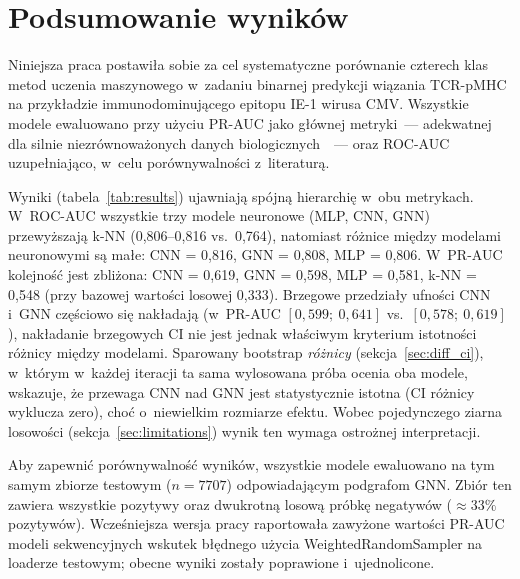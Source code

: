 \documentclass{SGGW-thesis}
\begin{document}
\section{Podsumowanie wyników}

Niniejsza praca postawiła sobie za cel systematyczne porównanie czterech klas metod uczenia
maszynowego w~zadaniu binarnej predykcji wiązania TCR-pMHC na przykładzie immunodominującego
epitopu IE-1 wirusa CMV. Wszystkie modele ewaluowano przy użyciu PR-AUC jako głównej metryki~---
adekwatnej dla silnie niezrównoważonych danych biologicznych~\cite{davis2006}~---
oraz ROC-AUC uzupełniająco, w~celu porównywalności z~literaturą.

Wyniki (tabela~\ref{tab:results}) ujawniają spójną hierarchię w~obu metrykach. W~ROC-AUC
wszystkie trzy modele neuronowe (MLP, CNN, GNN) przewyższają k-NN (0,806--0,816 vs.\ 0,764),
natomiast różnice między modelami neuronowymi są małe: CNN = 0,816, GNN = 0,808, MLP = 0,806.
W~PR-AUC kolejność jest zbliżona: CNN = 0,619, GNN = 0,598, MLP = 0,581, k-NN = 0,548
(przy bazowej wartości losowej 0,333). Brzegowe przedziały ufności CNN i~GNN częściowo się
nakładają (w~PR-AUC $[0{,}599;\ 0{,}641]$ vs.\ $[0{,}578;\ 0{,}619]$), nakładanie brzegowych CI
nie jest jednak właściwym kryterium istotności różnicy między modelami. Sparowany bootstrap
\textit{różnicy} (sekcja~\ref{sec:diff_ci}), w~którym w~każdej iteracji ta sama wylosowana próba
ocenia oba modele, wskazuje, że przewaga CNN nad GNN jest statystycznie istotna (CI różnicy
wyklucza zero), choć o~niewielkim rozmiarze efektu. Wobec pojedynczego ziarna losowości
(sekcja~\ref{sec:limitations}) wynik ten wymaga ostrożnej interpretacji.

Aby zapewnić porównywalność wyników, wszystkie modele ewaluowano na tym samym zbiorze testowym
($n{=}7707$) odpowiadającym podgrafom GNN. Zbiór ten zawiera wszystkie pozytywy oraz
dwukrotną losową próbkę negatywów (${\approx}33\%$ pozytywów). Wcześniejsza wersja pracy
raportowała zawyżone wartości PR-AUC modeli sekwencyjnych wskutek błędnego użycia
WeightedRandomSampler na loaderze testowym; obecne wyniki zostały poprawione i~ujednolicone.
\end{document}
